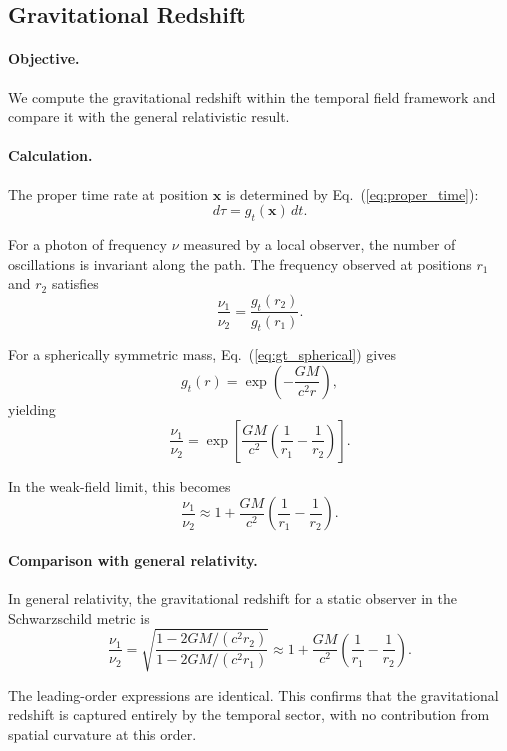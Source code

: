 \documentclass[12pt]{article}
\begin{document}
\subsection{Gravitational Redshift}
\label{sec:redshift}

\paragraph{Objective.}
We compute the gravitational redshift within the temporal field framework and compare it with the general relativistic result.

\paragraph{Calculation.}
The proper time rate at position $\mathbf{x}$ is determined by Eq.~(\ref{eq:proper_time}):
$$
d\tau = g_t(\mathbf{x})\, dt .
$$

For a photon of frequency $\nu$ measured by a local observer, the number of oscillations is invariant along the path. The frequency observed at positions $r_1$ and $r_2$ satisfies
\begin{equation}
\frac{\nu_1}{\nu_2} = \frac{g_t(r_2)}{g_t(r_1)} .
\end{equation}

For a spherically symmetric mass, Eq.~(\ref{eq:gt_spherical}) gives
$$
g_t(r) = \exp\left(-\frac{GM}{c^2 r}\right) ,
$$
yielding
$$
\frac{\nu_1}{\nu_2}
= \exp\left[\frac{GM}{c^2}\left(\frac{1}{r_1} - \frac{1}{r_2}\right)\right] .
$$

In the weak-field limit, this becomes
\begin{equation}
\frac{\nu_1}{\nu_2}
\approx 1 + \frac{GM}{c^2}\left(\frac{1}{r_1} - \frac{1}{r_2}\right) .
\end{equation}

\paragraph{Comparison with general relativity.}
In general relativity, the gravitational redshift for a static observer in the Schwarzschild metric is
\begin{equation}
\frac{\nu_1}{\nu_2}
= \sqrt{\frac{1 - 2GM/(c^2 r_2)}{1 - 2GM/(c^2 r_1)}}
\approx 1 + \frac{GM}{c^2}\left(\frac{1}{r_1} - \frac{1}{r_2}\right) .
\end{equation}

The leading-order expressions are identical. This confirms that the gravitational redshift is captured entirely by the temporal sector, with no contribution from spatial curvature at this order.
\end{document}
